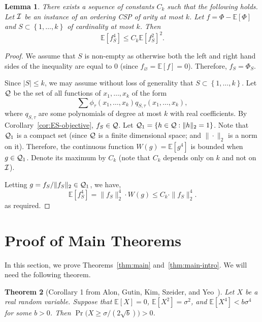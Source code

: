 \documentclass[11pt]{article}
\newcommand {\set}   [1] {\left\{ #1 \right\}}
\newcommand {\Exp}       {\mathbb{E}}
\newcommand {\E}     [1] {\Exp\left[#1\right]}
\newcommand {\calQ}  {{\cal{Q}}}
\newtheorem{theorem}{Theorem}
\newtheorem{lemma}[theorem]{Lemma}
\begin{document}
\begin{lemma}\label{lem:bound-on-C}
There exists a sequence of constants $C_k$ such that the following holds. Let $\cal I$ be an instance of an ordering CSP of arity at most $k$. Let $f = \Phi - \E{\Phi}$ and $S \subset \set{1,\dots, k}$ of cardinality at most $k$. Then	
$$\E{f_{S}^4} \leq C_k  \E{f_{S}^2}^2.$$
\end{lemma}
\begin{proof}
We assume that $S$ is non-empty as otherwise both the left and right hand sides of the inequality are equal to $0$
(since $f_{\varnothing} = \E{f} = 0$). Therefore, $f_{S} = \Phi_{S}$.

Since $|S| \leq k$, we may assume without loss of generality that $S \subset \set{1,\dots, k}$.
Let $\calQ$ be the set of all functions
of $x_1,\dots, x_{k}$ of the form
$$\sum \phi_{\tau}(x_1,\dots,x_k) q_{S,\tau}(x_1,\dots, x_k),$$
where $q_{S,\tau}$ are some polynomials of degree at most $k$ with real coefficients. By Corollary~\ref{cor:ES-objective}, $f_{S} \in \calQ$. Let $\calQ_1 =\set{h \in \calQ: \|h\|_2 = 1}$. Note that $\calQ_1$ is
a compact set (since $\calQ$ is a finite dimensional space; and $\|\cdot\|_2$ is a norm on it). Therefore, the continuous
function
$W(g) = \E{g^4}$
is bounded when $g \in\calQ_1$. Denote its maximum by $C_k$
(note that $C_k$ depends only on $k$ and not on $\cal I$).

Letting $g=  f_{S} / \|f_{S}\|_2 \in \calQ_1$,  we have,
$$\E{f_S^4} = \|f_{S}\|_2^4 \cdot W(g) \leq C_k \cdot \|f_{S}\|_2^4.$$
as required.
\end{proof}


\section{Proof of Main Theorems}\label{sec:proof-main-thm}
In this section, we prove Theorems~\ref{thm:main} and~\ref{thm:main-intro}. We will need the following theorem.
\begin{theorem}[Corollary 1 from Alon, Gutin, Kim, Szeider, and Yeo~\cite{AGKSY}]\label{thm:AGKSY}
Let $X$ be a real random variable. Suppose that $\E{X} = 0$, $\E{X^2} = \sigma^2$, and $\E{X^4} < b\sigma^4$
for some $b > 0$. Then $\Pr\big(X \geq \sigma / (2\sqrt b)\big)> 0$.	
\end{theorem}
\end{document}

